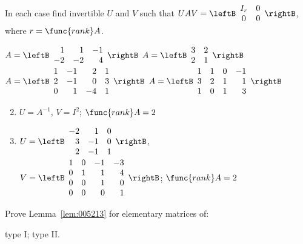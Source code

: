 \begin{multicols}{2}
\begin{ex}
In each case find invertible $U$ and $V$ such that $UAV = \leftB \begin{array}{cc}
I_{r} & 0 \\
0 & 0
\end{array} \rightB$, where $r = \func{rank }A$.
\begin{exenumerate}
\exitem $A = \leftB \begin{array}{rrr}
1 & 1 & -1 \\
-2 & -2 & 4
\end{array} \rightB$
\exitem $A = \leftB \begin{array}{rr}
3 & 2 \\
2 & 1
\end{array} \rightB$
\exitem* $A = \leftB \begin{array}{rrrr}
1 & -1 & 2 & 1 \\
2 & -1 & 0 & 3 \\
0 & 1 & -4 & 1
\end{array} \rightB$
\exitem* $A = \leftB \begin{array}{rrrr}
1 & 1 & 0 & -1 \\
3 & 2 & 1 & 1 \\
1 & 0 & 1 & 3
\end{array} \rightB$
\end{exenumerate}
\begin{sol}
\begin{enumerate}[label={\alph*.}]
\setcounter{enumi}{1}
\item $U = A^{-1}$, $V = I^{2}$; $\func{rank }A = 2$

\setcounter{enumi}{3}
\item $U = \leftB \begin{array}{rrr}
-2 & 1 & 0 \\
3 & -1 & 0 \\
2 & -1 & 1
\end{array} \rightB$, \\ $V = \leftB \begin{array}{rrrr}
1 & 0 & -1 & -3 \\
0 & 1 & 1 & 4 \\
0 & 0 & 1 & 0 \\
0 & 0 & 0 & 1
\end{array} \rightB$; $\func{rank }A = 2$
\end{enumerate}
\end{sol}
\end{ex}

\begin{ex}
Prove Lemma~\ref{lem:005213} for elementary matrices of:
\begin{exenumerate}
\exitem type I;
\exitem type II.
\end{exenumerate}
\end{ex}


\end{multicols}
